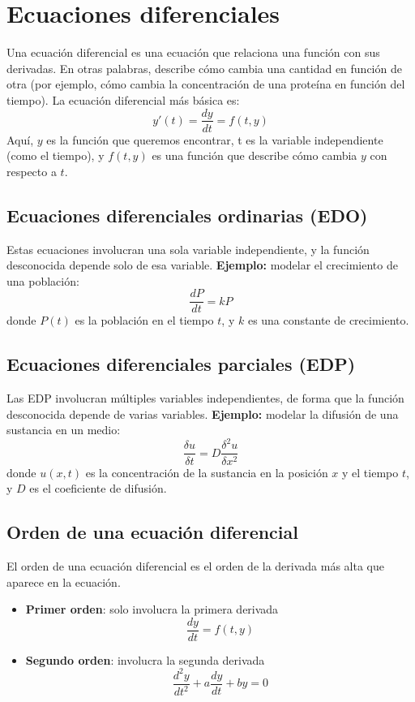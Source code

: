 \section{Ecuaciones diferenciales}
Una ecuación diferencial es una ecuación que relaciona una función con sus derivadas. En otras palabras, describe cómo cambia una cantidad en función de otra (por ejemplo, cómo cambia la concentración de una proteína en función del tiempo).
La ecuación diferencial más básica es:
$$y'(t) = \frac{dy}{dt} = f(t,y)$$
Aquí, $y$ es la función que queremos encontrar, t es la variable independiente (como el tiempo), y $f(t, y)$ es una función que describe cómo cambia $y$ con respecto a $t$.

\subsection{Ecuaciones diferenciales ordinarias (EDO)}
Estas ecuaciones involucran una sola variable independiente, y la función desconocida depende solo de esa variable. 
\textbf{Ejemplo:} modelar el crecimiento de una población:
$$\frac{dP}{dt} = kP$$
donde $P(t)$ es la población en el tiempo $t$, y $k$ es una constante de crecimiento.

\subsection{Ecuaciones diferenciales parciales (EDP)}
Las EDP involucran múltiples variables independientes, de forma que la función desconocida depende de varias variables. 
\textbf{Ejemplo:} modelar la difusión de una sustancia en un medio:
$$\frac{\delta u}{\delta t} = D\frac{\delta^2u}{\delta x^2}$$
donde $u(x, t)$ es la concentración de la sustancia en la posición $x$ y el tiempo $t$, y $D$ es el coeficiente de difusión.

\subsection{Orden de una ecuación diferencial}
El orden de una ecuación diferencial es el orden de la derivada más alta que aparece en la ecuación.
\begin{itemize}
\item \textbf{Primer orden}: solo involucra la primera derivada
$$\frac{dy}{dt} = f(t, y)$$
\item \textbf{Segundo orden}: involucra la segunda derivada
$$\frac{d^2y}{dt^2} + a\frac{dy}{dt} + by = 0$$
\end{itemize}

